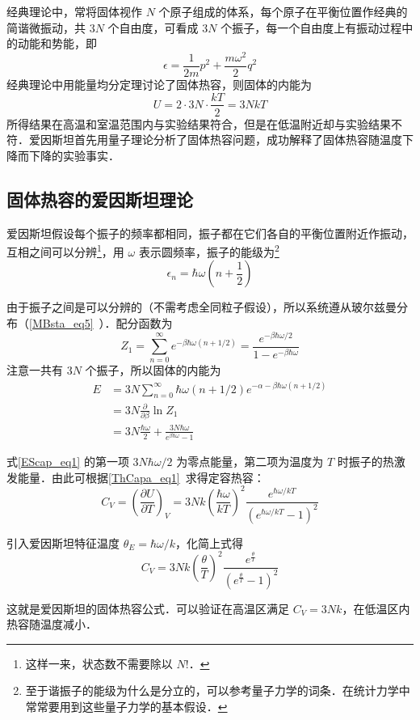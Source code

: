 
经典理论中，常将固体视作 $N$ 个原子组成的体系，每个原子在平衡位置作经典的简谐微振动，共 $3N$ 个自由度，可看成 $3N$ 个振子，每一个自由度上有振动过程中的动能和势能，即
\begin{equation}
\epsilon=\frac{1}{2m}p^2+\frac{m\omega^2}{2}q^2
\end{equation}
经典理论中用能量均分定理讨论了固体热容，则固体的内能为
\begin{equation}
U=2\cdot 3N\cdot \frac{kT}{2}=3NkT
\end{equation}
所得结果在高温和室温范围内与实验结果符合，但是在低温附近却与实验结果不符．爱因斯坦首先用量子理论分析了固体热容问题，成功解释了固体热容随温度下降而下降的实验事实．

\subsection{固体热容的爱因斯坦理论}
爱因斯坦假设每个振子的频率都相同，振子都在它们各自的平衡位置附近作振动，互相之间可以分辨\footnote{这样一来，状态数不需要除以 $N!$．}，用 $\omega$ 表示圆频率，振子的能级为\footnote{至于谐振子的能级为什么是分立的，可以参考量子力学的词条．在统计力学中常常要用到这些量子力学的基本假设．}
\begin{equation}
\epsilon_n=\hbar \omega\left(n+\frac{1}{2}\right)
\end{equation}

由于振子之间是可以分辨的（不需考虑全同粒子假设），所以系统遵从玻尔兹曼分布（\autoref{MBsta_eq5}~）．配分函数为
\begin{equation}
Z_1=\sum_{n=0}^\infty e^{-\beta \hbar \omega(n+1/2)}=\frac{e^{-\beta\hbar \omega/2}}{1-e^{-\beta\hbar\omega}}
\end{equation}
注意一共有 $3N$ 个振子，所以固体的内能为
\begin{equation}\label{EScap_eq1}
\begin{aligned}
E&=3N\sum_{n=0}^\infty \hbar\omega(n+1/2)e^{-\alpha-\beta\hbar\omega(n+1/2)}\\
&=3N\frac{\partial }{\partial \beta}\ln Z_1\\
&=3N\frac{\hbar \omega}{2}+\frac{3N\hbar \omega}{e^{\beta\hbar\omega}-1}
\end{aligned}
\end{equation}

式\autoref{EScap_eq1} 的第一项 $3N \hbar\omega/2$ 为零点能量，第二项为温度为 $T$ 时振子的热激发能量．由此可根据\autoref{ThCapa_eq1}~求得定容热容：
\begin{equation}
C_V=\left(\frac{\partial U}{\partial T}\right)_V=3Nk\left(\frac{\hbar \omega}{kT}\right)^2\frac{e^{\hbar \omega/kT}}{(e^{\hbar \omega/kT}-1)^2}
\end{equation}

引入爱因斯坦特征温度 $\theta_E=\hbar\omega/k$，化简上式得
\begin{equation}
C_V=3Nk\left(\frac{\theta}{T}\right)^2\frac{e^{\frac{\theta}{T}}}{(e^{\frac{\theta}{T}}-1)^2}
\end{equation}

这就是爱因斯坦的固体热容公式．可以验证在高温区满足 $C_V=3Nk$，在低温区内热容随温度减小．

